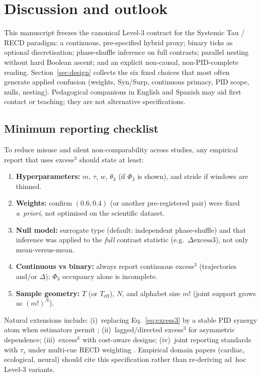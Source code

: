 \documentclass[11pt,a4paper]{article}
\begin{document}
\section{Discussion and outlook}
\label{sec:discussion}

This manuscript freezes the canonical Level-3 contract for the
Systemic Tau / RECD paradigm: a continuous, pre-specified hybrid proxy;
binary ticks as optional discretisation; phase-shuffle inference on full
contrasts; parallel nesting without hard Boolean ascent; and an explicit
non-causal, non-PID-complete reading. Section~\ref{sec:design} collects the
six fixed choices that most often generate applied confusion (weights,
Syn/Surp, continuous primacy, PID scope, nulls, nesting). Pedagogical
companions in English and Spanish may aid first contact or teaching; they
are not alternative specifications.

\subsection{Minimum reporting checklist}
\label{sec:checklist}

To reduce misuse and silent non-comparability across studies, any empirical
report that uses excess$^3$ should state at least:

\begin{enumerate}[leftmargin=*,itemsep=2pt]
  \item \textbf{Hyperparameters:} $m$, $\tau$, $w$, $\theta_3$ (if $\Phi_3$
  is shown), and stride if windows are thinned.
  \item \textbf{Weights:} confirm $(0.6,0.4)$ (or another pre-registered
  pair) were fixed \emph{a~priori}, not optimised on the scientific dataset.
  \item \textbf{Null model:} surrogate type (default: independent
  phase-shuffle) and that inference was applied to the \emph{full} contrast
  statistic (e.g.\ $\Delta\mathrm{excess3}$), not only mean-versus-mean.
  \item \textbf{Continuous vs binary:} always report continuous excess$^3$
  (trajectories and/or $\Delta$); $\Phi_3$ occupancy alone is incomplete.
  \item \textbf{Sample geometry:} $T$ (or $T_{\mathrm{eff}}$), $N$, and
  alphabet size $m!$ (joint support grows as $(m!)^N$).
\end{enumerate}

Natural extensions include: (i)~replacing Eq.~\eqref{eq:excess3} by a
stable PID synergy atom when estimators permit
\citep{Williams2010,Lizier2014}; (ii)~lagged/directed excess$^3$ for
asymmetric dependence; (iii)~excess$^k$ with cost-aware designs; (iv)~joint
reporting standards with $\tau_s$ under multi-cue RECD weighting
\citep{Padilla2026framework}. Empirical domain papers (cardiac, ecological,
neural) should cite this specification rather than re-deriving ad~hoc
Level-3 variants.
\end{document}
